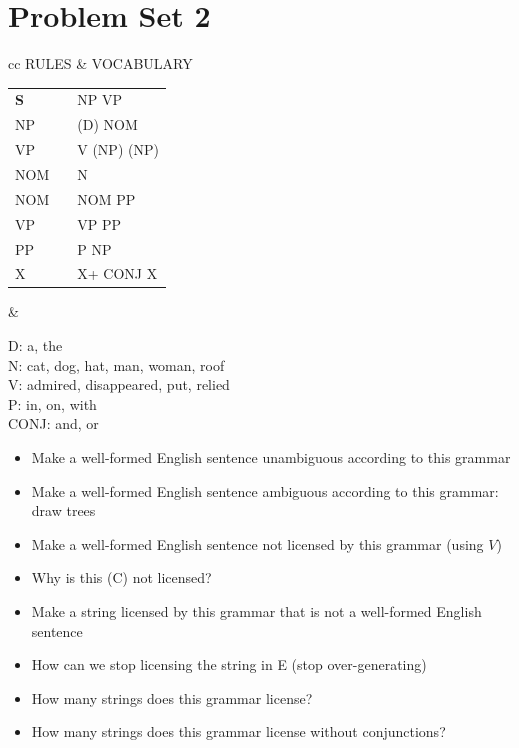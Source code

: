 \documentclass[a4paper,landscape,headrule,footrule]{foils}
\begin{document}
\section{Problem Set 2}

\begin{tabular}{cc}
  RULES & VOCABULARY \\[2ex]
  \begin{minipage}[t]{0.4\linewidth}
    \begin{tabular}[t]{lll}
      \textbf{S}  & \into & NP VP \\
      NP & \into & (D) NOM\\
      VP & \into & V (NP) (NP)\\
      NOM & \into & N\\
      NOM & \into & NOM PP \\
      VP  & \into & VP PP\\
      PP  & \into & P NP\\
      X   & \into & X+ CONJ X\\
    \end{tabular} 
  \end{minipage} &
  \begin{minipage}[t]{0.5\linewidth}
    \begin{flushleft}
  D: a, the\\
  N: cat, dog, hat, man, woman, roof\\
  V: admired, disappeared, put, relied\\
  P: in, on, with\\
  CONJ: and, or
\end{flushleft}
\end{minipage}
\end{tabular}




\begin{itemize}
\item [A] Make a well-formed English sentence unambiguous
according to this grammar
\item  [B] Make a well-formed English sentence ambiguous
according to this grammar: draw trees
\item  [C] Make a well-formed English sentence not licensed by
this grammar (using $V$)
\item [D] Why is this (C) not licensed?

\newpage
\item [E] Make a string licensed by this grammar that is not a
  well-formed English sentence
\item [F] How can we stop licensing the string in E (stop over-generating)
\item [G] How many strings does this grammar license?
\item [H] How many strings does this grammar license without conjunctions?
\end{itemize}
\end{document}
